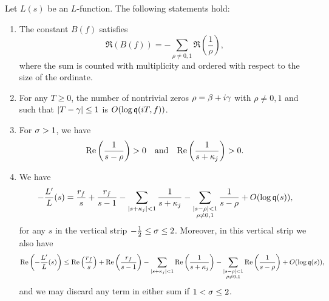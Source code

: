 \documentclass[12pt]{article}
\begin{document}
    \begin{lemma}\label{lem:powerful_L-function_approximation_lemma}
      Let \(L(s)\) be an \(L\)-function. The following statements hold:
      \begin{enumerate}[label*=(\roman*)]
        \item The constant \(B(f)\) satisfies
        \[
          \Re(B(f)) = -\sum_{\rho \neq 0,1}\Re\left(\frac{1}{\rho}\right),
        \]
        where the sum is counted with multiplicity and ordered with respect to the size of the ordinate.
        \item For any \(T \ge 0\), the number of nontrivial zeros \(\rho = \beta+i\gamma\) with \(\rho \neq 0,1\) and such that \(|T-\gamma| \le 1\) is \(O(\log{\mathfrak{q}(iT,f)})\).
        \item For \(\sigma > 1\), we have
        \[
          \mathrm{Re}\left(\frac{1}{s-\rho}\right) > 0 \quad \text{and} \quad \mathrm{Re}\left(\frac{1}{s+\kappa_{j}}\right) > 0.
        \]
        \item We have
        \[
          -\frac{L'}{L}(s) = \frac{r_{f}}{s}+\frac{r_{f}}{s-1}-\sum_{|s+\kappa_{j}| < 1}\frac{1}{s+\kappa_{j}}-\sum_{\substack{|s-\rho| < 1 \\ \rho \neq 0,1}}\frac{1}{s-\rho}+O(\log{\mathfrak{q}(s)}),
        \]
        for any \(s\) in the vertical strip \(-\frac{1}{2} \le \sigma \le 2\). Moreover, in this vertical strip we also have
        \[
          \mathrm{Re}\left(-\frac{L'}{L}(s)\right) \le \mathrm{Re}\left(\frac{r_{f}}{s}\right)+\mathrm{Re}\left(\frac{r_{f}}{s-1}\right)-\sum_{|s+\kappa_{j}| < 1}\mathrm{Re}\left(\frac{1}{s+\kappa_{j}}\right)-\sum_{\substack{|s-\rho| < 1 \\ \rho \neq 0,1}}\mathrm{Re}\left(\frac{1}{s-\rho}\right)+O(\log{\mathfrak{q}(s)}),
        \]
        and we may discard any term in either sum if \(1 < \sigma \le 2\).
      \end{enumerate}
    \end{lemma}
\end{document}
